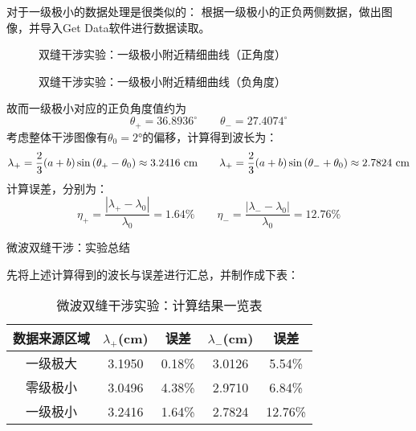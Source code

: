 \documentclass[11pt]{article}
\begin{document}
\bigskip
对于一级极小的数据处理是很类似的：
根据一级极小的正负两侧数据，做出图像，并导入Get Data软件进行数据读取。

\begin{figure}[H]
    \centering
    \hspace{0.5cm}
    \caption{双缝干涉实验：一级极小附近精细曲线（正角度）}
\end{figure}

\begin{figure}[H]
    \centering
    \hspace{0.5cm}
    \caption{双缝干涉实验：一级极小附近精细曲线（负角度）}
\end{figure}



故而一级极小对应的正负角度值约为
\[
   \theta_+=36.8936^{\circ}\qquad\theta_{-}=27.4074^{\circ} 
\]
考虑整体干涉图像有$\theta_0=2°$的偏移，计算得到波长为：
\[
   \lambda_+=\frac{2}{3}(a+b)\sin {(\theta_+-\theta_0)}\approx 3.2416\,\,{\rm cm}\qquad 
   \lambda_+=\frac{2}{3}(a+b)\sin {(\theta_{-}+\theta_0)}\approx 2.7824\,\,{\rm cm}
\]
计算误差，分别为：
\begin{displaymath}
    \eta_+=\frac{|\lambda_+-\lambda_0|}{\lambda_0}=1.64\%\qquad
    \eta_{-}=\frac{|\lambda_{-}-\lambda_0|}{\lambda_0}=12.76\%
\end{displaymath}



\begin{center}
    \begin{tcolorbox}[colback=gray!10,%
                      colframe=black,%
                      width=5cm,%
                      arc=1mm, auto outer arc,
                      boxrule=0.5pt,
                     ]
                     \begin{center}
                    微波双缝干涉：实验总结      
                     \end{center}
    \end{tcolorbox}
\end{center}


先将上述计算得到的波长与误差进行汇总，并制作成下表：
\begin{table}[H]
    \centering
    \begin{tabular}{ccc|cc}
        \toprule
        数据来源区域 & $\lambda_+$(cm) & 误差 & $\lambda_{-}$(cm) & 误差 \\ 
        \midrule
        一级极大 & 3.1950 & 0.18\% & 3.0126 & 5.54\% \\ 
        零级极小 & 3.0496 & 4.38\% & 2.9710 & 6.84\% \\ 
        一级极小 & 3.2416 & 1.64\% & 2.7824 & 12.76\% \\ 
        \bottomrule
    \end{tabular}
    \caption{微波双缝干涉实验：计算结果一览表}
\end{table}
\end{document}
